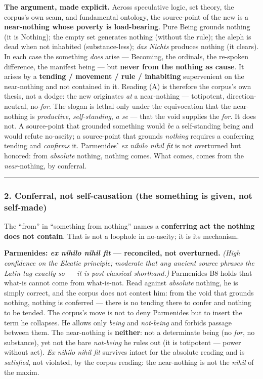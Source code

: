 \documentclass[11pt]{article}
\begin{document}
\textbf{The argument, made explicit.} Across speculative logic, set theory, the corpus's own seam, and fundamental ontology, the source-point of the new is a \textbf{near-nothing whose poverty is load-bearing}. Pure Being grounds nothing (it is Nothing); the empty set generates nothing (without the rule); the aleph is dead when not inhabited (substance-less); \emph{das Nichts} produces nothing (it clears). In each case the something \emph{does} arise — Becoming, the ordinals, the re-spoken difference, the manifest being — but \textbf{never from the nothing as cause}. It arises by a \textbf{tending /\allowbreak{} movement /\allowbreak{} rule /\allowbreak{} inhabiting} supervenient on the near-nothing and not contained in it. Reading (A) is therefore the corpus's own thesis, not a dodge: the new originates \emph{at} a near-nothing — totipotent, direction-neutral, no-\emph{for}. The slogan is lethal only under the equivocation that the near-nothing is \emph{productive}, \emph{self-standing}, \emph{a se} — that the void supplies the \emph{for}. It does not. A source-point that grounded something would \emph{be} a self-standing being and would refute no-aseity; a source-point that grounds \emph{nothing} requires a conferring tending and \emph{confirms} it. Parmenides' \emph{ex nihilo nihil fit} is not overturned but honored: from \emph{absolute} nothing, nothing comes. What comes, comes from the \emph{near}-nothing, by conferral.

\medskip\noindent\rule{\linewidth}{0.3pt}\medskip

\subsubsection*{2. Conferral, not self-causation (the something is given, not self-made)}

The ``from'' in ``something from nothing'' names a \textbf{conferring act the nothing does not contain}. That is not a loophole in no-aseity; it is its mechanism.

\textbf{Parmenides: \emph{ex nihilo nihil fit} — reconciled, not overturned.} \emph{(High confidence on the Eleatic principle; moderate that any ancient source phrases the Latin tag exactly so — it is post-classical shorthand.)} Parmenides B8 holds that what-is cannot come from what-is-not. Read against \emph{absolute} nothing, he is simply correct, and the corpus does not contest him: from the void that grounds nothing, nothing is conferred — there is no tending there to confer and nothing to be tended. The corpus's move is not to deny Parmenides but to insert the term he collapses. He allows only \emph{being} and \emph{not-being} and forbids passage between them. The near-nothing is \textbf{neither}: not a determinate being (no \emph{for}, no substance), yet not the bare \emph{not-being} he rules out (it is totipotent — power without act). \emph{Ex nihilo nihil fit} survives intact for the absolute reading and is \emph{satisfied}, not violated, by the corpus reading: the near-nothing is not the \emph{nihil} of the maxim.
\end{document}
